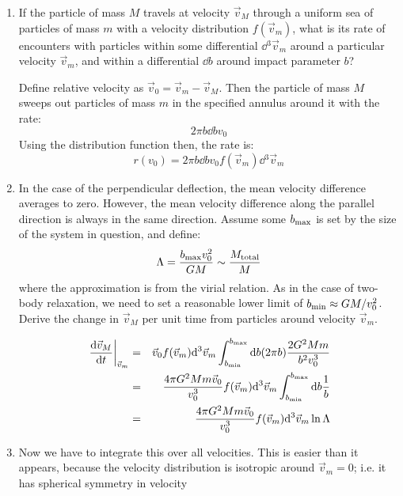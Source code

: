 \begin{enumerate}
\begin{enumerate}
\item If the particle of mass $M$ travels at velocity $\vec{v}_M$
through a uniform sea of particles of mass $m$ with a velocity
distribution $f(\vec{v}_m)$, what is its rate of encounters with
particles within some differential $\dd{}^3\vec{v}_m$ around a
particular velocity $\vec{v}_m$, and within a differential $\dd{b}$
around impact parameter $b$?
\begin{answer}
Define relative velocity as $\vec{v}_0 = \vec{v}_m - \vec{v}_M$. Then
the particle of mass $M$ sweeps out particles of mass $m$ in the
specified annulus around it with the rate:
\begin{equation}
2\pi b \dd{b} v_0
\end{equation}
Using the distribution function then, the rate is:
\begin{equation}
r(v_0) = 2\pi b \dd{b} v_0 f(\vec{v}_m)
\dd{}^3\vec{v}_m
\end{equation}
\end{answer}
\item In the case of the perpendicular deflection, the mean velocity
difference averages to zero. However, the mean velocity difference
along the parallel direction is always in the same direction. Assume
some $b_{\rm max}$ is set by the size of the system in question, and
define:
\begin{equation}
\Lambda = \frac{b_{\rm max}v_0^2}{GM} \sim \frac{M_{\rm total}}{M}
\end{equation}
where the approximation is from the virial relation.  As in the case
of two-body relaxation, we need to set a reasonable lower limit of
$b_{\rm min} \approx G M / v_0^2$.  Derive the change in
$\vec{v}_M$ per unit time from particles around velocity $\vec{v}_m$.
\begin{answer}
\begin{eqnarray}
\left.\frac{{\rm d}\vec{v}_M}{{\rm d}t} \right|_{\vec{v}_m}  &=&
\vec{v}_0 f(\vec{v}_m) {\rm d}^3 \vec{v}_m
\int_{b_{\rm min}}^{b_{\rm max}} {\rm d}b (2\pi b) \frac{2G^2Mm}{b^2 v_0^3} \cr
&=&
\frac{4 \pi G^2Mm \vec{v}_0}{v_0^3}
f(\vec{v}_m) {\rm d}^3 \vec{v}_m
\int_{b_{\rm min}}^{b_{\rm max}} {\rm d}b \frac{1}{b} \cr
&=&
\frac{4 \pi G^2Mm \vec{v}_0}{v_0^3}
f(\vec{v}_m) {\rm d}^3 \vec{v}_m \ln \Lambda
\end{eqnarray}
\end{answer}
\item
Now we have to integrate this over all velocities. This is easier than
it appears, because the velocity distribution is isotropic around
$\vec{v}_m = 0$; i.e. it has spherical symmetry in velocity

\end{enumerate}
\end{enumerate}

